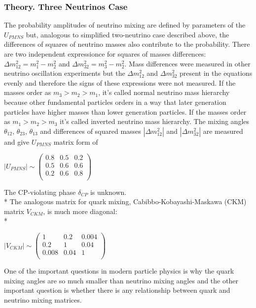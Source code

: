 \begin{frame}\frametitle{Theory. Three Neutrinos Case}
  \scriptsize
  The probability amplitudes of neutrino mixing are defined by parameters of the $U_{PMNS}$ but, analogous to simplified two-neutrino case described above, the differences of squares of neutrino masses also contribute to the probability. There are two independent expressionce for squares of masses differences: ${\Delta}m_{12}^2 = m_1^2-m_2^2$ and ${\Delta}m_{32}^2 = m_3^2-m_2^2$. Mass differences were measured in other neutrino oscillation experiments but the ${\Delta}m_{12}^2$ and ${\Delta}m_{32}^2$ present in the equations evenly and therefore the signs of these expressions were not measured. If the masses order as $m_3 > m_2 > m_1$, it's called normal neutrino mass hierarchy because other fundamental particles orders in a way that later generation particles have higher masses than lower generation particles. If the masses order as $m_1 > m_2 > m_3$ it's called inverted neutrino mass hierarchy. The mixing angles $\theta_{12}$, $\theta_{23}$, $\theta_{13}$ and differences of squared masses $|{\Delta}m_{12}^2|$ and $|{\Delta}m_{32}^2|$ are measured and give $U_{PMNS}$ matrix form of\\
  \begin{center}
  $|U_{PMNS}| \sim
  \begin{pmatrix}
  0.8 & 0.5 & 0.2 \\ 0.5 & 0.6 & 0.6 \\ 0.2 & 0.6 & 0.8 \\
  \end{pmatrix}$\\
  \end{center}
  The CP-violating phase $\delta_{CP}$ is unknown.\\*
  The analogous matrix for quark mixing, Cabibbo-Kobayashi-Maskawa (CKM) matrix $V_{CKM}$, is much more diagonal:\\*
  \begin{center}
  $|V_{CKM}| \sim
  \begin{pmatrix}
  1 & 0.2 & 0.004 \\ 0.2 & 1 & 0.04 \\ 0.008 & 0.04 & 1 \\
  \end{pmatrix}$\\
  \end{center}
  One of the important questions in modern particle physics is why the quark mixing angles are so much smaller than neutrino mixing angles and the other important question is whether there is any relationship between quark and neutrino mixing matrices.\\
\end{frame}

